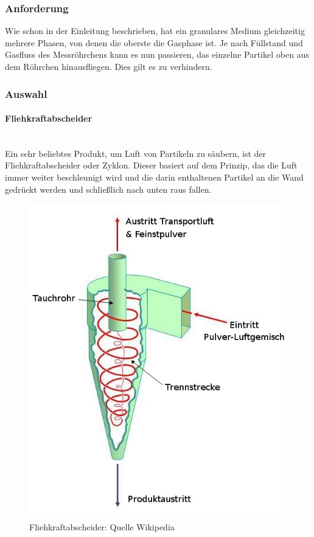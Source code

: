 \subsubsection{Anforderung}

Wie schon in der Einleitung beschrieben, hat ein granulares Medium gleichzeitig mehrere Phasen, von denen die oberste die Gasphase ist. Je nach Füllstand und Gasfluss des Messröhrchens kann es nun passieren, das einzelne Partikel oben aus dem Röhrchen hinausfliegen. Dies gilt es zu verhindern.

\subsubsection{Auswahl}

\paragraph{Fliehkraftabscheider} 

\hfill \\

Ein sehr beliebtes Produkt, um Luft von Partikeln zu säubern, ist der Fliehkraftabscheider oder Zyklon. Dieser basiert auf dem Prinzip, das die Luft immer weiter beschleunigt wird und die darin enthaltenen Partikel an die Wand gedrückt werden und schließlich nach unten raus fallen. \\


\begin{figure}[h]
	\begin{center}
		\includegraphics[scale=0.4]{Umsetzung_Fliehkraftabscheider.jpg}
		\caption{Fliehkraftabscheider: Quelle Wikipedia}
	\end{center}
\end{figure}



